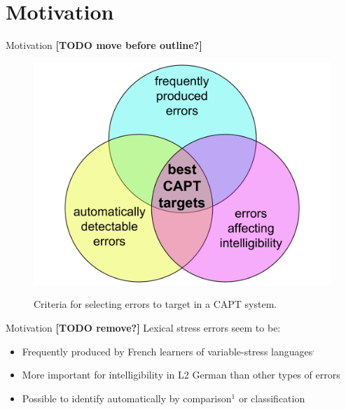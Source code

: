 \documentclass[xcolor={dvipsnames}]{beamer}
\newcommand{\TODO}[1]{{\color{red}\textbf{[TODO #1]}}}
\begin{document}
\section{Motivation}
\begin{frame}{Motivation \TODO{move before outline?}}
		\begin{figure}
			\centering
			\caption{Criteria for selecting errors to target in a CAPT system.}
			\includegraphics[width=.8\textwidth]{../img/error-venn}
			\label{fig:errors}
		\end{figure}
\end{frame}

\begin{frame}{Motivation \TODO{remove?}}
Lexical stress errors seem to be: 
\begin{itemize}
\item Frequently produced by French learners of variable-stress languages$^{,}$
\item More important for intelligibility in L2 German than other types of errors
\item Possible to identify automatically by comparison$^1$ or classification
\end{itemize}

\end{frame}
\end{document}
